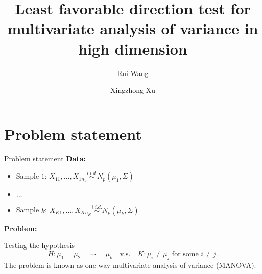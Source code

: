 \documentclass{beamer}
\title{Least favorable direction test for multivariate analysis of variance in high dimension}
\date{\mydateformat{\displaydate{date}}}
\author{Rui Wang\inst{1} \and Xingzhong Xu\inst{2}}
\institute[Beijing Institute of Technology]{%
    School of Mathematics and Statistics\\ Beijing Institute of Technology\\
}
\DeclareMathOperator{\myE}{E}
\newcommand{\bZ}{\mathbf{Z}}
\newcommand{\bX}{\mathbf{X}}
\theoremstyle{plain}
\theoremstyle{definition}
\theoremstyle{remark}
\begin{document}
\maketitle
\section{Problem statement}
\begin{frame}{Problem statement}
    \textbf{Data:}
    \begin{itemize}
        \item 
            Sample $1$: $X_{11},\ldots, X_{1n_1}\overset{i.i.d.}{\sim}N_p(\mu_1,\Sigma)$
        \item
            $\ldots$
        \item
            Sample $k$: $X_{K1},\ldots, X_{Kn_K}\overset{i.i.d.}{\sim}N_p(\mu_k,\Sigma)$
    \end{itemize}
    \textbf{Problem:}

    Testing the hypothesis
    \begin{equation*}
            H: \mu_1=\mu_2=\cdots=\mu_k\quad \text{v.s.}\quad K: \text{$\mu_i\neq \mu_j$ for some $i\neq j$}.
    \end{equation*}
    The problem is known as one-way multivariate analysis of variance (MANOVA).
\end{frame}
\end{document}
